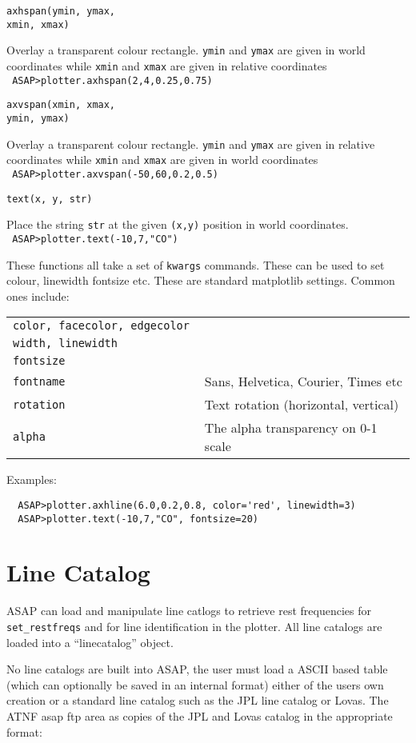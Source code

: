 \documentclass[11pt]{article}
\newcommand{\cmd}[1]{{\tt #1}}
\newcommand{\bigcommanddef}[3]{
  \begin{minipage}[t]{45mm}\tt #1\end{minipage}\hspace{3mm}
  \begin{minipage}[t]{\textwidth-47mm}#2 \\ \tt #3\end{minipage}
}
\begin{document}
\bigcommanddef{axhspan(ymin, ymax, \\ \hspace*{20mm}xmin,
 xmax)}{Overlay a transparent colour rectangle. \cmd{ymin} and
 \cmd{ymax} are given in world coordinates while \cmd{xmin} and
 \cmd{xmax} are given in relative coordinates}{ 
ASAP>plotter.axhspan(2,4,0.25,0.75) 
}

\bigcommanddef{axvspan(xmin, xmax, \\ \hspace*{20mm} ymin,
 ymax)}{Overlay a transparent colour rectangle. \cmd{ymin} and
 \cmd{ymax} are given in relative coordinates while \cmd{xmin} and
 \cmd{xmax} are given in world coordinates}{ 
ASAP>plotter.axvspan(-50,60,0.2,0.5) 
}

\bigcommanddef{text(x, y, str)}{Place the string \cmd{str} at the
 given \cmd{(x,y)} position in world coordinates.}{
ASAP>plotter.text(-10,7,"CO") 
}

These functions all take a set of \cmd{kwargs} commands. These can be
used to set colour, linewidth fontsize etc. These are standard
matplotlib settings. Common ones include:

\begin{tabular}{ll}
 \tt color, facecolor, edgecolor \\
 \tt width, linewidth \\
 \tt fontsize \\
 \tt fontname & Sans, Helvetica, Courier, Times etc\\
 \tt rotation & Text rotation (horizontal, vertical) \\
 \tt alpha & The alpha transparency on 0-1 scale\\
\end{tabular}

Examples: 
\begin{verbatim}
  ASAP>plotter.axhline(6.0,0.2,0.8, color='red', linewidth=3)
  ASAP>plotter.text(-10,7,"CO", fontsize=20)
\end{verbatim}

\section{Line Catalog}
\label{sec:linecat}
ASAP can load and manipulate line catlogs to
retrieve rest frequencies for \cmd{set\_restfreqs} and for line
identification in the plotter. All line catalogs are loaded into a ``linecatalog'' object.

No line catalogs are built into ASAP, the user must load a ASCII based
table (which can optionally be saved in an internal format) either of
the users own creation or a standard line catalog such as the JPL line
catalog or Lovas. The ATNF asap ftp area as copies of the JPL and
Lovas catalog in the appropriate format:
\end{document}
